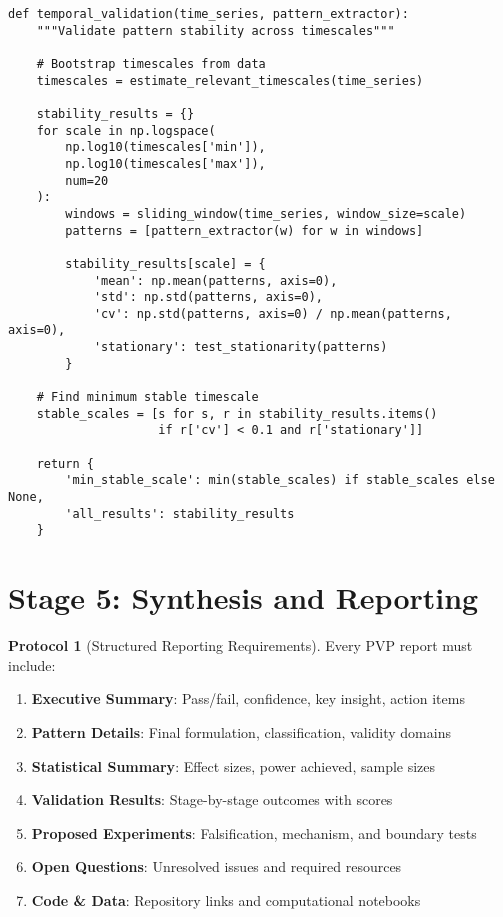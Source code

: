 \documentclass[12pt,oneside]{memoir}
\theoremstyle{plain}
\theoremstyle{definition}
\newtheorem{protocol}[theorem]{Protocol}
\theoremstyle{remark}
\newcommand{\PVP}{\textsc{PVP}}
\begin{document}
\begin{lstlisting}[caption={Temporal Stability Analysis}]
def temporal_validation(time_series, pattern_extractor):
    """Validate pattern stability across timescales"""
    
    # Bootstrap timescales from data
    timescales = estimate_relevant_timescales(time_series)
    
    stability_results = {}
    for scale in np.logspace(
        np.log10(timescales['min']),
        np.log10(timescales['max']),
        num=20
    ):
        windows = sliding_window(time_series, window_size=scale)
        patterns = [pattern_extractor(w) for w in windows]
        
        stability_results[scale] = {
            'mean': np.mean(patterns, axis=0),
            'std': np.std(patterns, axis=0),
            'cv': np.std(patterns, axis=0) / np.mean(patterns, axis=0),
            'stationary': test_stationarity(patterns)
        }
    
    # Find minimum stable timescale
    stable_scales = [s for s, r in stability_results.items() 
                     if r['cv'] < 0.1 and r['stationary']]
    
    return {
        'min_stable_scale': min(stable_scales) if stable_scales else None,
        'all_results': stability_results
    }
\end{lstlisting}

\section{Stage 5: Synthesis and Reporting}

\begin{protocol}[Structured Reporting Requirements]
Every \PVP{} report must include:
\begin{enumerate}
\item \textbf{Executive Summary}: Pass/fail, confidence, key insight, action items
\item \textbf{Pattern Details}: Final formulation, classification, validity domains
\item \textbf{Statistical Summary}: Effect sizes, power achieved, sample sizes
\item \textbf{Validation Results}: Stage-by-stage outcomes with scores
\item \textbf{Proposed Experiments}: Falsification, mechanism, and boundary tests
\item \textbf{Open Questions}: Unresolved issues and required resources
\item \textbf{Code \& Data}: Repository links and computational notebooks
\end{enumerate}
\end{protocol}
\end{document}
